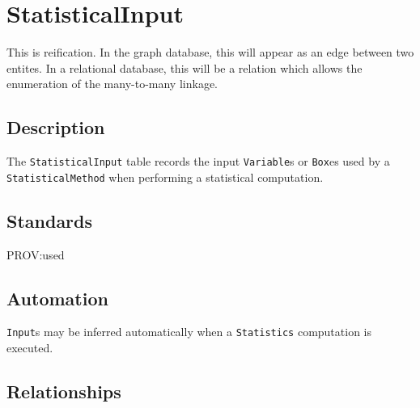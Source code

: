 \documentclass[
]{article}
\begin{document}
\section{StatisticalInput}\label{statisticalinput}

This is reification. In the graph database, this will appear as an edge
between two entites. In a relational database, this will be a relation
which allows the enumeration of the many-to-many linkage.

\subsection{Description}\label{description-28}

The \texttt{StatisticalInput} table records the input \texttt{Variable}s
or \texttt{Box}es used by a \texttt{StatisticalMethod} when performing a
statistical computation.

\subsection{Standards}\label{standards-30}

PROV:used

\subsection{Automation}\label{automation-30}

\texttt{Input}s may be inferred automatically when a \texttt{Statistics}
computation is executed.

\subsection{Relationships}\label{relationships-25}
\end{document}
